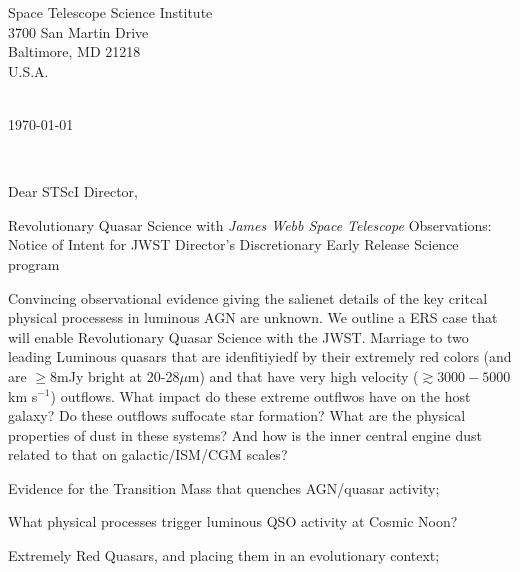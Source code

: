 \documentclass[11pt,a4paper]{letter} %
\def\opening#1{\thispagestyle{empty}
{\centering\fromaddress \vspace{0.6in} \\                  %
\hspace*{\longindentation}\today\hspace*{\fill}\par} %
{\raggedright \toname \\ \toaddress \par}                  %
\vspace{0.4in}                                                              %
\noindent #1                                                               %
}
\begin{document}

\begin{letter}
{Space Telescope Science Institute\\ 
3700 San Martin Drive\\
Baltimore, MD 21218 \\
U.S.A.
}



\opening{Dear STScI Director,}

\smallskip
\begin{center}
{\sc Revolutionary Quasar Science with {\it James Webb Space Telescope} Observations:\\
Notice of Intent for JWST Director's Discretionary Early Release Science program}
\end{center}

Convincing observational evidence giving the salienet details of the key critcal physical processess in luminous AGN are unknown. 
We outline a ERS case that will enable  Revolutionary Quasar Science with the JWST. 
Marriage to two leading 
Luminous quasars that are idenfitiyiedf by their extremely red colors (and are $\geq8$mJy bright at 20-28$\mu$m)
and that have very high velocity ($\gtrsim3000-5000$ km s$^{-1}$) outflows. 
What impact do these extreme outflwos have on the host galaxy?
Do these outflows suffocate star formation?
What are the physical properties of dust in these systems? And how is the inner central engine dust related to 
that on galactic/ISM/CGM scales?
\item{Evidence for the Transition Mass that quenches AGN/quasar activity;}
\item{What physical processes trigger luminous QSO activity at Cosmic Noon?}
\item{Extremely Red Quasars, and placing them in an evolutionary context;}


\end{letter}
\end{document}
